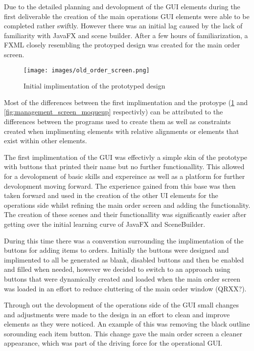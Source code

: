 Due to the detailed planning and devolopment of the GUI elements during the first deliverable the creation of the main operations GUI elements were able to be completed rather swiftly. However there was an initial lag caused by the lack of familiarity with JavaFX and scene builder. After a few hours of familiarization, a FXML closely resembling the protoyped design was created for the main order screen. 

\begin{figure}[ht]
	\centering
	\texttt{[image: images/old\_order\_screen.png]}
	\caption{Initial implimentation of the prototyped design}
	\label{fig:old_order_screen}
\end{figure}

Most of the differences between the first implimentation and the protoype (\ref{fig:old_order_screen} and \ref{fig:management_screen_moqueup} respectivly) can be attributed to the differences between the programs used to create them as well as constraints created when implimenting elements with relative alignments or elements that exist within other elements. 

The first implimentation of the GUI was effectivly a simple skin of the prototype with buttons that printed their name but no further functionallity. This allowed for a devolopment of basic skills and expereince as well as a platform for further devolopment moving forward. The experience gained from this base was then taken forward and used in the creation of the other UI elements for the operations side whilst refining the main order screen and adding the functionality. The creation of these scenes and their functionallity was significantly easier after getting over the initial learning curve of JavaFX and SceneBuilder.

During this time there was a converstion surrounding the implimentation of the buttons for adding items to orders. Initially the buttons were designed and implimented to all be generated as blank, disabled buttons and then be enabled and filled when needed, however we decided to switch to an approach using buttons that were dynamically created and loaded when the main order screen was loaded in an effort to reduce cluttering of the main order window (QRXX?).

Through out the devolopment of the operations side of the GUI small changes and adjustments were made to the design in an effort to clean and improve elements as they were noticed. An example of this was removing the black outline sorounding each item button. This change gave the main order screen a cleaner appearance, which was part of the driving force for the operational GUI.

